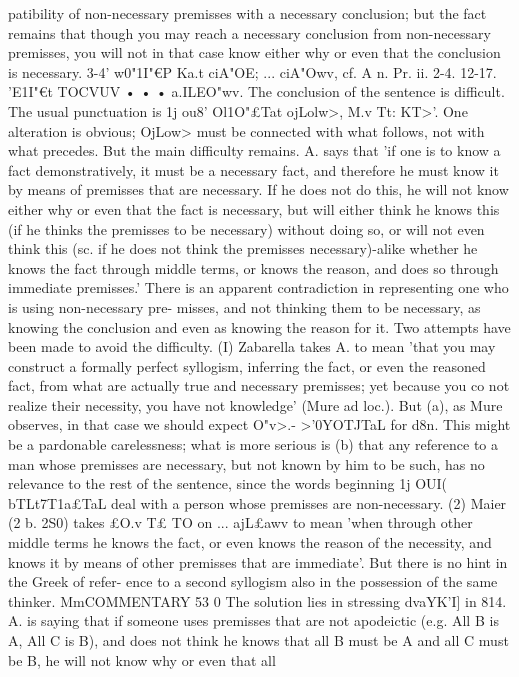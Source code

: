 {{{{{{{{{patibility of non-necessary premisses with a necessary conclusion;
but the fact remains that though you may reach a necessary
conclusion from non-necessary premisses, you will not in that
case know either why or even that the conclusion is necessary.
3-4' w0"1I"€P Ka.t ciA"OE; ... ciA"Owv, cf. A n. Pr. ii. 2-4.
12-17. 'E1I"€t TOCVUV • • • a.ILEO"wv. The conclusion of the sentence
is difficult. The usual punctuation is 1j ou8' Ol1}O"£Tat ojLolw>, M.v
Tt: KT>'. One alteration is obvious; OjLo{w> must be connected with
what follows, not with what precedes. But the main difficulty
remains. A. says that 'if one is to know a fact demonstratively,
it must be a necessary fact, and therefore he must know it by
means of premisses that are necessary. If he does not do this,
he will not know either why or even that the fact is necessary, but
will either think he knows this (if he thinks the premisses to be
necessary) without doing so, or will not even think this (sc. if
he does not think the premisses necessary)-alike whether he
knows the fact through middle terms, or knows the reason, and
does so through immediate premisses.' There is an apparent
contradiction in representing one who is using non-necessary pre-
misses, and not thinking them to be necessary, as knowing the
conclusion and even as knowing the reason for it. Two attempts
have been made to avoid the difficulty. (I) Zabarella takes A.
to mean 'that you may construct a formally perfect syllogism,
inferring the fact, or even the reasoned fact, from what are
actually true and necessary premisses; yet because you co not
realize their necessity, you have not knowledge' (Mure ad loc.).
But (a), as Mure observes, in that case we should expect O"v>.-
>'0Y{OTJTaL for d8n. This might be a pardonable carelessness; what
is more serious is (b) that any reference to a man whose premisses
are necessary, but not known by him to be such, has no relevance
to the rest of the sentence, since the words beginning 1j OUI(
bTLt7T1}a£TaL deal with a person whose premisses are non-necessary.
(2) Maier (2 b. 2S0) takes £O.v T£ TO on ... ajL£awv to mean 'when
through other middle terms he knows the fact, or even knows the
reason of the necessity, and knows it by means of other premisses
that are immediate'. But there is no hint in the Greek of refer-
ence to a second syllogism also in the possession of the same
thinker.
MmCOMMENTARY
53 0
The solution lies in stressing dvaYK'I] in 814. A. is saying that
if someone uses premisses that are not apodeictic (e.g. All B is
A, All C is B), and does not think he knows that all B must be
A and all C must be B, he will not know why or even that all
}}}}}}}}}
